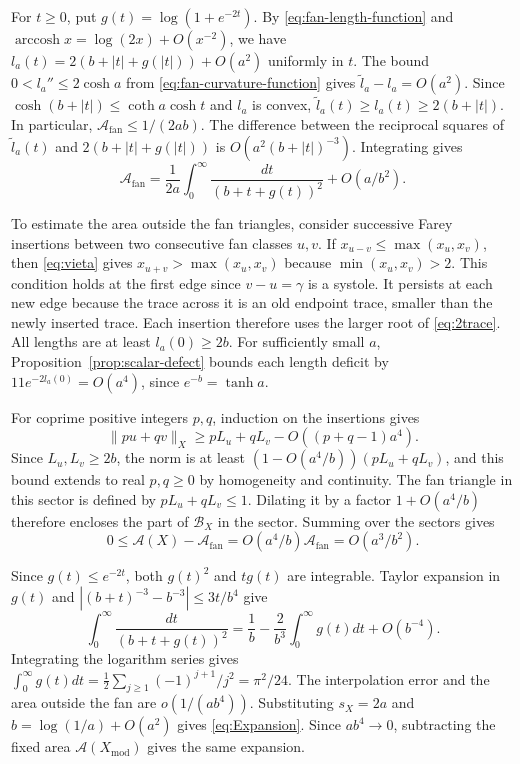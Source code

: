 \documentclass[10pt,twoside]{article}
\theoremstyle{plain}
\theoremstyle{definition}
\theoremstyle{remark}
\DeclareMathOperator{\arccosh}{arccosh}
\newcommand{\A}{\mathcal A}
\newcommand{\B}{\mathcal B}
\newcommand{\Xmod}{X_{\mathrm{mod}}}
\begin{document}
For $t\geq0$, put $g(t)=\log(1+e^{-2t})$. By
\eqref{eq:fan-length-function} and
$\arccosh x=\log(2x)+O(x^{-2})$, we have
$l_a(t)=2(b+|t|+g(|t|))+O(a^2)$ uniformly in $t$.
The bound $0<l_a''\leq2\cosh a$ from
\eqref{eq:fan-curvature-function} gives $\widetilde l_a-l_a=O(a^2)$.
Since $\cosh(b+|t|)\leq\coth a\cosh t$ and $l_a$ is convex,
$\widetilde l_a(t)\geq l_a(t)\geq2(b+|t|)$.
In particular, $\A_{\mathrm{fan}}\leq1/(2ab)$.
The difference between the reciprocal squares of $\widetilde l_a(t)$
and $2(b+|t|+g(|t|))$ is $O(a^2(b+|t|)^{-3})$. Integrating gives
$$
\A_{\mathrm{fan}}
=\frac1{2a}\int_0^\infty\frac{dt}{(b+t+g(t))^2}+O(a/b^2).
$$

To estimate the area outside the fan triangles, consider successive
Farey insertions between two consecutive fan classes $u,v$.
If $x_{u-v}\leq\max(x_u,x_v)$, then \eqref{eq:vieta} gives
$x_{u+v}>\max(x_u,x_v)$ because $\min(x_u,x_v)>2$.
This condition holds at the first edge since $v-u=\gamma$ is a
systole. It persists at each new edge because the trace across it
is an old endpoint trace, smaller than the newly inserted trace.
Each insertion therefore uses the larger root of \eqref{eq:2trace}.
All lengths are at least $l_a(0)\geq2b$. For sufficiently small $a$,
Proposition~\ref{prop:scalar-defect} bounds each length deficit by
$11e^{-2l_a(0)}=O(a^4)$, since $e^{-b}=\tanh a$.

For coprime positive integers $p,q$, induction on the insertions gives
$$
\|pu+qv\|_X\geq pL_u+qL_v-O((p+q-1)a^4).
$$
Since $L_u,L_v\geq2b$, the norm is at least
$(1-O(a^4/b))(pL_u+qL_v)$, and this bound extends to real $p,q\geq0$
by homogeneity and continuity.
The fan triangle in this sector is defined by $pL_u+qL_v\leq1$.
Dilating it by a factor $1+O(a^4/b)$ therefore encloses the part
of $\B_X$ in the sector. Summing over the sectors gives
$$
0\leq\A(X)-\A_{\mathrm{fan}}
=O(a^4/b)\A_{\mathrm{fan}}=O(a^3/b^2).
$$

Since $g(t)\leq e^{-2t}$, both $g(t)^2$ and $tg(t)$ are integrable.
Taylor expansion in $g(t)$ and
$|(b+t)^{-3}-b^{-3}|\leq3t/b^4$ give
$$
\int_0^\infty\frac{dt}{(b+t+g(t))^2}
=\frac1b-\frac{2}{b^3}\int_0^\infty g(t)dt+O(b^{-4}).
$$
Integrating the logarithm series gives
$\int_0^\infty g(t)dt=\frac12\sum_{j\geq1}(-1)^{j+1}/j^2=\pi^2/24$.
The interpolation error and the area outside the fan are $o(1/(ab^4))$.
Substituting $s_X=2a$ and $b=\log(1/a)+O(a^2)$ gives \eqref{eq:Expansion}.
Since $ab^4\to0$, subtracting the fixed area $\A(\Xmod)$ gives the
same expansion.
\end{document}
